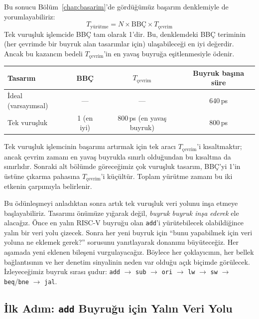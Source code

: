\begin{ornek}
Bu sonucu Bölüm~\ref{chap:basarim}'de gördüğümüz başarım denklemiyle de yorumlayabiliriz:
\[
T_{\text{yürütme}} = N \times \text{BBÇ} \times T_{\text{çevrim}}
\]
Tek vuruşluk işlemcide BBÇ tam olarak 1'dir. Bu, denklemdeki BBÇ teriminin (her çevrimde bir buyruk alan tasarımlar için) ulaşabileceği en iyi değerdir. Ancak bu kazancın bedeli $T_{\text{çevrim}}$'in en yavaş buyruğa eşitlenmesiyle ödenir.

\begin{center}
\small
\begin{tabular}{lccc}
\toprule
\textbf{Tasarım} & \textbf{BBÇ} & \boldmath$T_{\text{çevrim}}$ & \textbf{Buyruk başına süre} \\
\midrule
İdeal (varsayımsal) & --- & --- & 640\,ps \\
Tek vuruşluk         & 1 (en iyi) & 800\,ps (en yavaş buyruk) & 800\,ps \\
\bottomrule
\end{tabular}
\end{center}

Tek vuruşluk işlemcinin başarımı artırmak için tek aracı $T_{\text{çevrim}}$'i kısaltmaktır; ancak çevrim zamanı en yavaş buyrukla sınırlı olduğundan bu kısaltma da sınırlıdır. Sonraki alt bölümde göreceğimiz çok vuruşluk tasarım, BBÇ'yi 1'in üstüne çıkarma pahasına $T_{\text{çevrim}}$'i küçültür. Toplam yürütme zamanı bu iki etkenin çarpımıyla belirlenir.
\end{ornek}

Bu ödünleşmeyi anladıktan sonra artık tek vuruşluk veri yolunu inşa etmeye başlayabiliriz. Tasarımı önümüze yığarak değil, \emph{buyruk buyruk inşa ederek} ele alacağız. Önce en yalın RISC-V buyruğu olan \texttt{add}'i yürütebilecek olabildiğince yalın bir veri yolu çizecek. Sonra her yeni buyruk için ``bunu yapabilmek için veri yoluna ne eklemek gerek?'' sorusunu yanıtlayarak donanımı büyüteceğiz. Her aşamada yeni eklenen bileşeni vurgulayacağız. Böylece her çoklayıcının, her bellek bağlantısının ve her denetim sinyalinin neden var olduğu açık biçimde görülecek. İzleyeceğimiz buyruk sırası şudur: \texttt{add} $\rightarrow$ \texttt{sub} $\rightarrow$ \texttt{ori} $\rightarrow$ \texttt{lw} $\rightarrow$ \texttt{sw} $\rightarrow$ \texttt{beq}/\texttt{bne} $\rightarrow$ \texttt{jal}.

\subsection{İlk Adım: \texttt{add} Buyruğu için Yalın Veri Yolu}
\label{subsec:vy-add}

